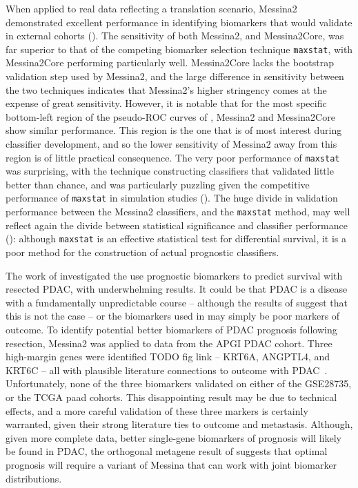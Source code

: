 \documentclass[dissertation.tex]{subfiles}
\begin{document}
When applied to real data reflecting a translation scenario, Messina2 demonstrated excellent performance in identifying biomarkers that would validate in external cohorts ().  The sensitivity of both Messina2, and Messina2Core, was far superior to that of the competing biomarker selection technique \texttt{maxstat}, with Messina2Core performing particularly well.  Messina2Core lacks the bootstrap validation step used by Messina2, and the large difference in sensitivity between the two techniques indicates that Messina2's higher stringency comes at the expense of great sensitivity.  However, it is notable that for the most specific bottom-left region of the pseudo-\gls{ROC} curves of , Messina2 and Messina2Core show similar performance.  This region is the one that is of most interest during classifier development, and so the lower sensitivity of Messina2 away from this region is of little practical consequence.  The very poor performance of \texttt{maxstat} was surprising, with the technique constructing classifiers that validated little better than chance, and was particularly puzzling given the competitive performance of \texttt{maxstat} in simulation studies ().  The huge divide in validation performance between the Messina2 classifiers, and the \texttt{maxstat} method, may well reflect again the divide between statistical significance and classifier performance (): although \texttt{maxstat} is an effective statistical test for differential survival, it is a poor method for the construction of actual prognostic classifiers.

The work of  investigated the use prognostic biomarkers to predict survival with resected \gls{PDAC}, with underwhelming results.  It could be that \gls{PDAC} is a disease with a fundamentally unpredictable course -- although the results of  suggest that this is not the case -- or the biomarkers used in  may simply be poor markers of outcome.  To identify potential better biomarkers of \gls{PDAC} prognosis following resection, Messina2 was applied to data from the \gls{APGI} \gls{PDAC} cohort.  Three high-margin genes were identified TODO fig link -- KRT6A, ANGPTL4, and KRT6C -- all with plausible literature connections to outcome with \gls{PDAC}~\cite{Adhikary2013,Choi2014,Kim2011b,Livasy2006,Padua2008,VandenBroeck2012,Xiao2012}.  Unfortunately, none of the three biomarkers validated on either of the GSE28735, or the \gls{TCGA} paad cohorts.  This disappointing result may be due to technical effects, and a more careful validation of these three markers is certainly warranted, given their strong literature ties to outcome and metastasis.  Although, given more complete data, better single-gene biomarkers of prognosis will likely be found in \gls{PDAC}, the orthogonal metagene result of  suggests that optimal prognosis will require a variant of Messina that can work with joint biomarker distributions.
\end{document}
